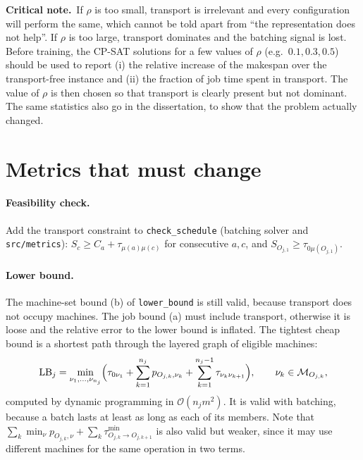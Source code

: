\documentclass[11pt,a4paper]{article}
\newcommand{\Mset}{\mathcal{M}}
\newcommand{\crit}[1]{\par\smallskip\noindent\textbf{Critical note.}\ #1\par\smallskip}
\begin{document}
\crit{If $\rho$ is too small, transport is irrelevant and every configuration
will perform the same, which cannot be told apart from ``the representation does
not help''. If $\rho$ is too large, transport dominates and the batching signal
is lost. Before training, the CP-SAT solutions for a few values of $\rho$ (e.g.\
$0.1,0.3,0.5$) should be used to report (i) the relative increase of the
makespan over the transport-free instance and (ii) the fraction of job time
spent in transport. The value of $\rho$ is then chosen so that transport is
clearly present but not dominant. The same statistics also go in the
dissertation, to show that the problem actually changed.}

\section{Metrics that must change}
\label{sec:metrics}

\paragraph{Feasibility check.} Add the transport constraint to
\texttt{check\_schedule} (batching solver and \texttt{src/metrics}):
$S_{c}\ge C_{a}+\tau_{\mu(a)\mu(c)}$ for consecutive $a,c$, and
$S_{O_{j,1}}\ge\tau_{0\mu(O_{j,1})}$.

\paragraph{Lower bound.} The machine-set bound (b) of \texttt{lower\_bound} is
still valid, because transport does not occupy machines. The job bound (a) must
include transport, otherwise it is loose and the relative error to the lower
bound is inflated. The tightest cheap bound is a shortest path through the
layered graph of eligible machines:
\begin{equation}
  \mathrm{LB}_j=\min_{\nu_1,\dots,\nu_{n_j}}\Bigl(\tau_{0\nu_1}+\sum_{k=1}^{n_j}p_{O_{j,k},\nu_k}
  +\sum_{k=1}^{n_j-1}\tau_{\nu_k\nu_{k+1}}\Bigr),\qquad \nu_k\in\Mset_{O_{j,k}},
\end{equation}
computed by dynamic programming in $\mathcal{O}(n_j m^2)$. It is valid with
batching, because a batch lasts at least as long as each of its members. Note
that $\sum_k\min_\nu p_{O_{j,k},\nu}+\sum_k\tau^{\min}_{O_{j,k}\to O_{j,k+1}}$ is
also valid but weaker, since it may use different machines for the same
operation in two terms.
\end{document}
